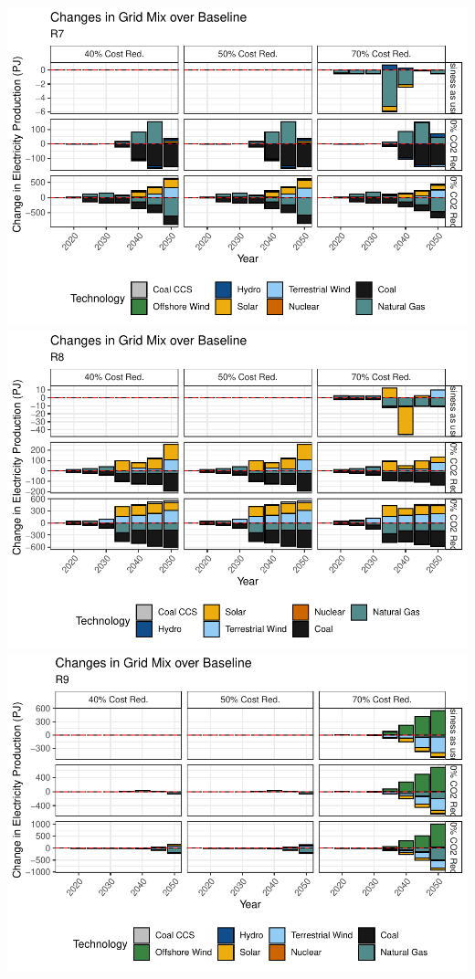 \documentclass[]{article}
\begin{document}
\includegraphics{osw_Report_files/figure-latex/unnamed-chunk-57-7.pdf}
\includegraphics{osw_Report_files/figure-latex/unnamed-chunk-57-8.pdf}
\includegraphics{osw_Report_files/figure-latex/unnamed-chunk-57-9.pdf}
\end{document}
